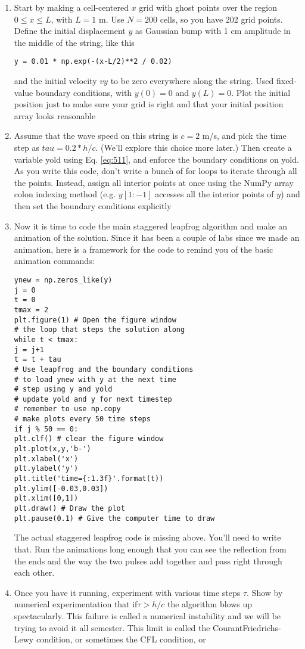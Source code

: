 \begin{enumerate}[label=(\alph*)]
\item Start by making a cell-centered $x$ grid with ghost points over the region
$0 \leq x \leq L$, with $L = 1$ m. Use $N = 200$ cells, so you have 202 grid
points. Define the initial displacement $y$ as Gaussian bump with 1 cm
amplitude in the middle of the string, like this
\begin{lstlisting}
y = 0.01 * np.exp(-(x-L/2)**2 / 0.02)
\end{lstlisting}
and the initial velocity $vy$ to be zero everywhere along the string. Used
fixed-value boundary conditions, with $y(0) = 0$ and $y(L) = 0$. Plot the
initial position just to make sure your grid is right and that your initial
position array looks reasonable
\item Assume that the wave speed on this string is $c = 2$ m/s, and pick
the time step as $tau = 0.2*h/c$. (We\rq ll explore this choice more
later.) Then create a variable yold using Eq. \eqref{eq:511}, and enforce the boundary conditions on yold. As you write this code, don\rq t write a
bunch of for loops to iterate through all the points. Instead, assign all
interior points at once using the NumPy array colon indexing method
(e.g. $y[1:-1]$ accesses all the interior points of $y$) and then set the
boundary conditions explicitly
\item Now it is time to code the main staggered leapfrog algorithm and make
an animation of the solution. Since it has been a couple of labs since
we made an animation, here is a framework for the code to remind
you of the basic animation commands:
\begin{lstlisting}
ynew = np.zeros_like(y)
j = 0
t = 0
tmax = 2
plt.figure(1) # Open the figure window
# the loop that steps the solution along
while t < tmax:
j = j+1
t = t + tau
# Use leapfrog and the boundary conditions
# to load ynew with y at the next time
# step using y and yold
# update yold and y for next timestep
# remember to use np.copy
# make plots every 50 time steps
if j % 50 == 0:
plt.clf() # clear the figure window
plt.plot(x,y,'b-')
plt.xlabel('x')
plt.ylabel('y')
plt.title('time={:1.3f}'.format(t))
plt.ylim([-0.03,0.03])
plt.xlim([0,1])
plt.draw() # Draw the plot
plt.pause(0.1) # Give the computer time to draw
\end{lstlisting}
The actual staggered leapfrog code is missing above. You’ll need to
write that. Run the animations long enough that you can see the
reflection from the ends and the way the two pulses add together and
pass right through each other.
\item Once you have it running, experiment with various time steps $\tau$. Show
by numerical experimentation that if$ \tau > h/c$ the algorithm blows up
spectacularly. This failure is called a numerical instability and we
will be trying to avoid it all semester. This limit is called the CourantFriedrichs-Lewy condition, or sometimes the CFL condition, or 


\end{enumerate}
